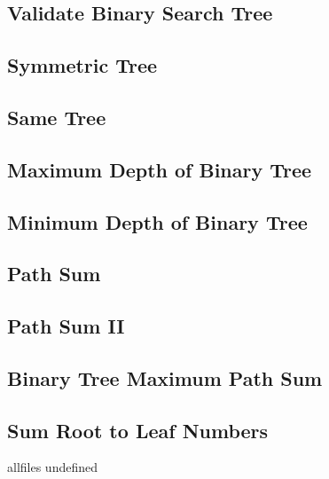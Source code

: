 \documentclass{article}
\begin{document}
\begin{CJK}{UTF8}{gbsn}     %

\else
	
\subsection{Validate Binary Search Tree}

\subsection{Symmetric Tree}

\subsection{Same Tree}

\subsection{Maximum Depth of Binary Tree}

\subsection{Minimum Depth of Binary Tree}

\subsection{Path Sum}

\subsection{Path Sum II}

\subsection{Binary Tree Maximum Path Sum}

\subsection{Sum Root to Leaf Numbers }


\fi

\ifx allfiles undefined
\end{CJK}
\end{document}

